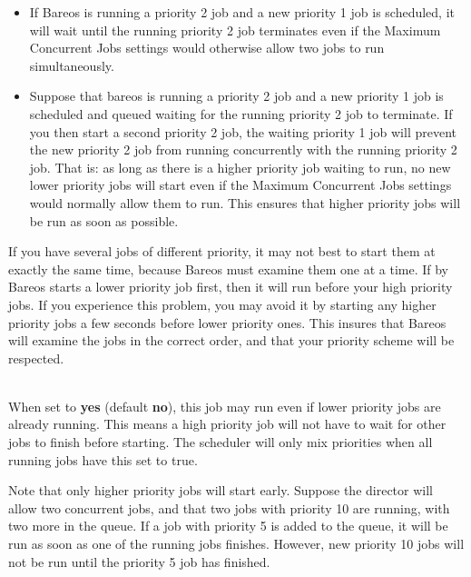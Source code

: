 \begin{description}
\begin{itemize}
\item If Bareos is running a priority 2 job and a new priority 1 job is
scheduled, it will wait until the running priority 2 job terminates even
if the Maximum Concurrent Jobs settings would otherwise allow two jobs
to run simultaneously.

\item Suppose that bareos is running a priority 2 job and a new priority 1
job is scheduled and queued waiting for the running priority 2 job to
terminate.  If you then start a second priority 2 job, the waiting
priority 1 job will prevent the new priority 2 job from running
concurrently with the running priority 2 job.  That is: as long as there
is a higher priority job waiting to run, no new lower priority jobs will
start even if the Maximum Concurrent Jobs settings would normally allow
them to run.  This ensures that higher priority jobs will be run as soon
as possible.
\end{itemize}

If you have several jobs of different priority, it may not best to start
them at exactly the same time, because Bareos must examine them one at a
time.  If by Bareos starts a lower priority job first, then it will run
before your high priority jobs.  If you experience this problem, you may
avoid it by starting any higher priority jobs a few seconds before lower
priority ones.  This insures that Bareos will examine the jobs in the
correct order, and that your priority scheme will be respected.

\label{AllowMixedPriority}
\item [Allow Mixed Priority = {\textless}yes{\textbar}no{\textgreater}] \hfill \\
When
set to {\bf yes} (default {\bf no}), this job may run even if lower
priority jobs are already running.  This means a high priority job
will not have to wait for other jobs to finish before starting.
The scheduler will only mix priorities when all running jobs have
this set to true.

Note that only higher priority jobs will start early.  Suppose the
director will allow two concurrent jobs, and that two jobs with
priority 10 are running, with two more in the queue.  If a job with
priority 5 is added to the queue, it will be run as soon as one of
the running jobs finishes.  However, new priority 10 jobs will not
be run until the priority 5 job has finished.
\end{description}

